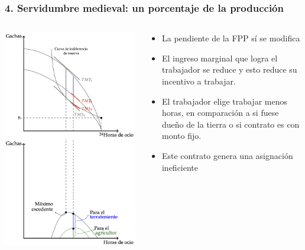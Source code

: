 \documentclass{beamer}
\begin{document}
\begin{frame}
\frametitle{4. Servidumbre medieval: un porcentaje de la producción}
\begin{columns}
  \begin{column}{0.55\textwidth}
    \centering
    \includegraphics[scale=0.28]{../Figures/C19.15.jpg}
  \end{column}

\begin{column}{0.45\textwidth}
    \begin{itemize}
        \item \small La pendiente de la FPP sí se modifica
        \item \small El ingreso marginal que logra el trabajador se reduce y esto reduce su incentivo a trabajar.
        \item \small El trabajador elige trabajar menos horas, en comparación a si fuese dueño de la tierra o si contrato es con monto fijo.
        \item \small Este contrato genera una asignación ineficiente
    \end{itemize}
  \end{column}
\end{columns}

\end{frame}
\end{document}
